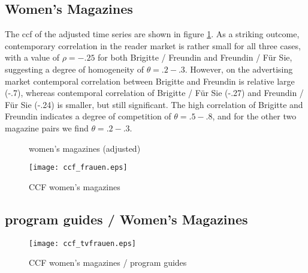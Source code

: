 \documentclass[12pt,a4paper]{scrreprt}
\begin{document}
\subsection{Women's Magazines}

The ccf of the adjusted time series are shown in figure \ref{fig_ccf_frauen}. As a striking outcome, contemporary correlation in the reader market is rather small for all three cases, with a value of $\rho=-.25$ for both Brigitte / Freundin and Freundin / Für Sie, suggesting a degree of homogeneity of $\theta=.2-.3$. However, on the advertising market contemporal correlation between Brigitte and Freundin is relative large (-.7), whereas contemporal correlation of Brigitte / Für Sie (-.27) and Freundin / Für Sie (-.24) is smaller, but still significant. The high correlation of Brigitte and Freundin indicates a degree of competition of $\theta=.5-.8$, and for the other two magazine pairs we find $\theta=.2-.3$. 



\begin{figure}[H]
\caption{women's magazines (adjusted)}
\begin{minipage}
	\centering
	
\end{minipage}
\hfil
\begin{minipage}
	\centering
	
\end{minipage}
\end{figure}



\begin{figure}[H]
\caption{CCF women's magazines}
\label{fig_ccf_frauen}
	\centering
	\texttt{[image: ccf\_frauen.eps]}
\end{figure}

\subsection{program guides / Women's Magazines }

\begin{figure}[H]
\caption{CCF women's magazines / program guides}
\label{ccf_tvfrauen}
	\centering
	\texttt{[image: ccf\_tvfrauen.eps]}
\end{figure}
\end{document}
